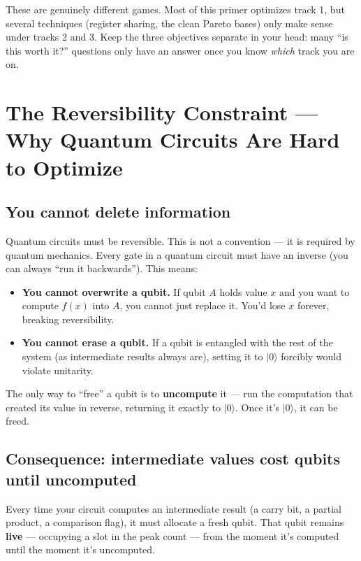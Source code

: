 \documentclass[11pt,a4paper]{article}
\newcommand{\ket}[1]{$|#1\rangle$\xspace}
\begin{document}
These are genuinely different games. Most of this primer optimizes track 1, but several techniques
(register sharing, the clean Pareto bases) only make sense under tracks 2 and 3. Keep the three
objectives separate in your head: many ``is this worth it?'' questions only have an answer once you
know \emph{which} track you are on.

\section{The Reversibility Constraint --- Why Quantum Circuits Are Hard to Optimize}
\label{sec:reversibility}

\subsection{You cannot delete information}

Quantum circuits must be reversible. This is not a convention --- it is required by quantum
mechanics. Every gate in a quantum circuit must have an inverse (you can always ``run it
backwards''). This means:

\begin{itemize}
  \item \textbf{You cannot overwrite a qubit.} If qubit $A$ holds value $x$ and you want to
    compute $f(x)$ into $A$, you cannot just replace it. You'd lose $x$ forever, breaking
    reversibility.
  \item \textbf{You cannot erase a qubit.} If a qubit is entangled with the rest of the system
    (as intermediate results always are), setting it to \ket{0} forcibly would violate unitarity.
\end{itemize}

The only way to ``free'' a qubit is to \textbf{uncompute} it --- run the computation that created
its value in reverse, returning it exactly to \ket{0}. Once it's \ket{0}, it can be freed.

\subsection{Consequence: intermediate values cost qubits until uncomputed}

Every time your circuit computes an intermediate result (a carry bit, a partial product, a
comparison flag), it must allocate a fresh qubit. That qubit remains \textbf{live} --- occupying
a slot in the peak count --- from the moment it's computed until the moment it's uncomputed.
\end{document}
